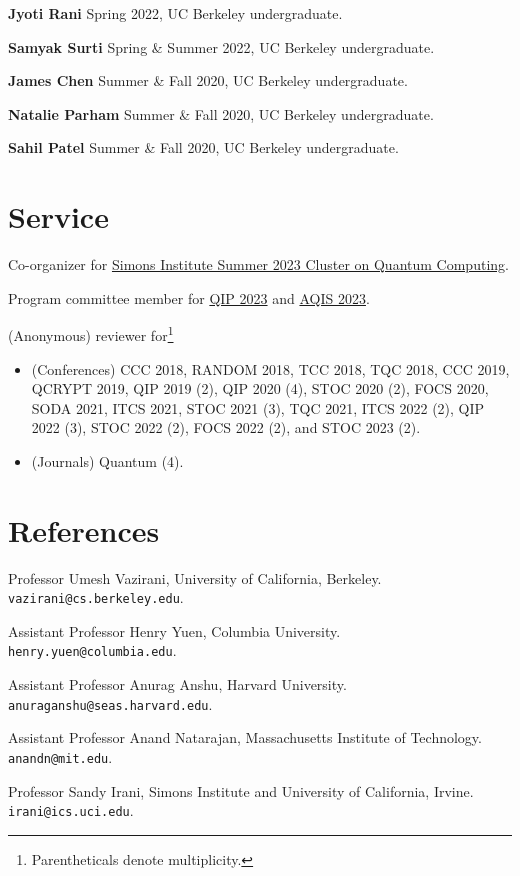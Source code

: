\documentclass[11pt]{article}
\begin{document}
\textbf{Jyoti Rani}
Spring 2022, 
UC Berkeley undergraduate.

\textbf{Samyak Surti}
Spring \& Summer 2022,
UC Berkeley undergraduate.

\textbf{James Chen}
Summer \& Fall 2020,
UC Berkeley undergraduate.

\textbf{Natalie Parham}
Summer \& Fall 2020,
UC Berkeley undergraduate.

\textbf{Sahil Patel} 
Summer \& Fall 2020,
UC Berkeley undergraduate.

\section{Service}
Co-organizer for \href{https://simons.berkeley.edu/programs/summer-cluster-quantum-computing}{Simons Institute Summer 2023 Cluster on Quantum Computing}.

Program committee member for \href{https://indico.cern.ch/event/1175020/}{QIP 2023} and \href{http://aqis-conf.org/2023/committees/}{AQIS 2023}.

(Anonymous) reviewer for\footnote{Parentheticals denote multiplicity.} 
\begin{itemize}
\item (Conferences) CCC 2018, RANDOM 2018, TCC 2018, TQC 2018, CCC 2019, QCRYPT 2019, QIP 2019 (2), QIP 2020 (4), STOC 2020 (2), FOCS 2020, SODA 2021, ITCS 2021, STOC 2021 (3), TQC 2021, ITCS 2022 (2), QIP 2022 (3), STOC 2022 (2), FOCS 2022 (2), and STOC 2023 (2).
\item (Journals) Quantum (4).
\end{itemize}


\section{References}
Professor Umesh Vazirani, University of California, Berkeley. \texttt{vazirani@cs.berkeley.edu}.

Assistant Professor Henry Yuen, Columbia University. \texttt{henry.yuen@columbia.edu}.

Assistant Professor Anurag Anshu, Harvard University. \texttt{anuraganshu@seas.harvard.edu}.

Assistant Professor Anand Natarajan, Massachusetts Institute of Technology. \texttt{anandn@mit.edu}.

Professor Sandy Irani, Simons Institute and University of California, Irvine. \texttt{irani@ics.uci.edu}.

\end{document}
